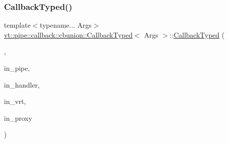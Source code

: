 \mbox{\label{structvt_1_1pipe_1_1callback_1_1cbunion_1_1_callback_typed_a53449646d77256c5ecb4deba498cac60}} 
\subsubsection{\texorpdfstring{Callback\+Typed()}{CallbackTyped()}\hspace{0.1cm}{\footnotesize\ttfamily [9/12]}}
{\footnotesize\ttfamily template$<$typename... Args$>$ \\
\hyperlink{structvt_1_1pipe_1_1callback_1_1cbunion_1_1_callback_typed}{vt\+::pipe\+::callback\+::cbunion\+::\+Callback\+Typed}$<$ Args $>$\+::\hyperlink{structvt_1_1pipe_1_1callback_1_1cbunion_1_1_callback_typed}{Callback\+Typed} (\begin{DoxyParamCaption}\item[{Raw\+Bcast\+Col\+Dir\+Tag\+Type}]{,  }\item[{\hyperlink{namespacevt_ac9852acda74d1896f48f406cd72c7bd3}{Pipe\+Type} const \&}]{in\+\_\+pipe,  }\item[{\hyperlink{namespacevt_af64846b57dfcaf104da3ef6967917573}{Handler\+Type} const}]{in\+\_\+handler,  }\item[{\hyperlink{structvt_1_1pipe_1_1callback_1_1cbunion_1_1_callback_raw_base_single_a734a9c83099de5bc1cd85f9da8dba7bb}{Auto\+Handler\+Type} const}]{in\+\_\+vrt,  }\item[{\hyperlink{namespacevt_a1b417dd5d684f045bb58a0ede70045ac}{Virtual\+Proxy\+Type} const \&}]{in\+\_\+proxy }\end{DoxyParamCaption})\hspace{0.3cm}{\ttfamily [inline]}}

\mbox{\label{structvt_1_1pipe_1_1callback_1_1cbunion_1_1_callback_typed_a24eedca0271b07c996a46fd79830f22a}} 
